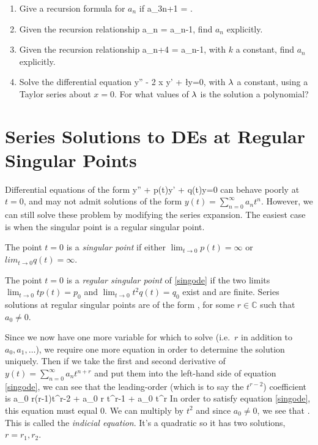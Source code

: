 \documentclass[12pt]{book}
\begin{document}
\begin{enumerate}
  \item
    Give a recursion formula for $a_n$ if 
    \bee
    a_{3n+1} = .
    \eee

  \item
    Given the recursion relationship
    \bee
    a_n = a_{n-1},
    \eee
    find $a_n$ explicitly.

  \item
    Given the recursion relationship
    \bee
    a_{n+4} =  a_{n-1},
    \eee
    with $k$ a constant, find $a_n$ explicitly.

  \item Solve the differential equation
    \bee
    y'' - 2 x y' + \l y=0,
    \eee
    with $\lambda$ a constant, using a Taylor series about $x=0$. For what values
    of $\lambda$ is the solution a polynomial?

\end{enumerate}
      


\chapter{Series Solutions to DEs at Regular Singular Points}
Differential equations of the form
\be
\label{singode}
y'' + p(t)y' + q(t)y=0
\ee
can behave poorly at $t=0$, and may not admit solutions of the form
$y(t) =\sum_{n=0}^\infty a_n t^n$. However, we can still solve these problem
by modifying the series expansion. The easiest case is when the singular
point is a regular singular point.

The point $t=0$ is a \emph{singular point} if either 
$\lim_{t \rightarrow 0}p(t)=\infty$ or  $lim_{t \rightarrow 0}q(t)=\infty$.

The point $t=0$ is a \emph{regular singular point} of \eqref{singode} if
the two limits $\lim_{t\rightarrow 0} t p(t) =p_0$ 
and $\lim_{t\rightarrow 0} t^2 q(t) =q_0$
exist and are finite. Series solutions at regular singular points are of the
form
\be
{},
\ee
for some $r\in\mathbb{C}$ such that $a_0 \neq 0$. 

Since we now have one more variable for which to solve (i.e.\ $r$ in addition
to $a_0, a_1,\dots$), we require one more equation in order to determine the
solution uniquely. Then if we take the first and second derivative of 
$y(t) = \sum_{n=0}^\infty a_n t^{n+r}$ and put them into the left-hand side of 
equation \eqref{singode}, we can see that the 
leading-order (which is to say the $t^{r-2}$) coefficient is 
\bee
a_0 r(r-1)t^{r-2} + a_0  r t^{r-1} + a_0  t^r 
\eee
In order to satisfy equation \eqref{singode}, this equation must equal $0$. 
We can multiply by $t^2$ and since $a_0 \neq 0$, we see that
\be
{}.
\ee
This is called the \emph{indicial equation}. It's a quadratic so it has two 
solutions, $r=r_1,r_2$.
\end{document}
